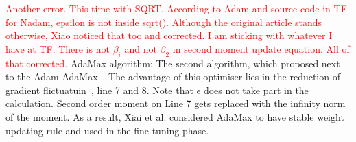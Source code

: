\textcolor{red}{Another error. This time with SQRT. According to Adam and source code in TF for Nadam, epsilon is not inside sqrt(). Although the original article stands otherwise, Xiao noticed that too and corrected. I am sticking with whatever I have at TF. There is not $\beta_i$ and not $\beta_2$ in second moment update equation. All of that corrected.}
AdaMax algorithm:
The second algorithm, which proposed next to the Adam AdaMax~\cite{kingma_adam_2017}.
The advantage of this optimiser lies in the reduction of gradient flictuatuin~\cite{xiao_accurate_2019}, line 7 and 8.
Note that $\epsilon$ does not take part in the calculation.
Second order moment on Line 7 gets replaced with the infinity norm of the moment.
As a result, Xiai et al. considered AdaMax to have stable weight updating rule and used in the fine-tuning phase.
